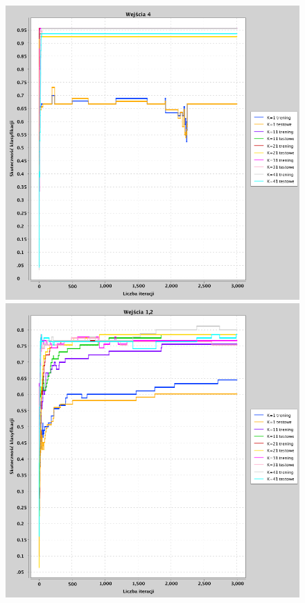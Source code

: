 \documentclass[a4paper, portrait,11pt]{article}
\begin{document}
\begin{figure}[!htb]
  \begin{minipage}{0.33\textwidth}
    \centering
    \includegraphics[width=1\linewidth]{../data/classification4/1/derivatives/1_4.png}
    \caption{\label{fig:41_1_4derivative}}
  \end{minipage}
  \begin{minipage}{0.33\textwidth}
    \centering
    \includegraphics[width=1\linewidth]{../data/classification4/1/derivatives/2_1,2.png}

\end{minipage}
\end{figure}
\end{document}
